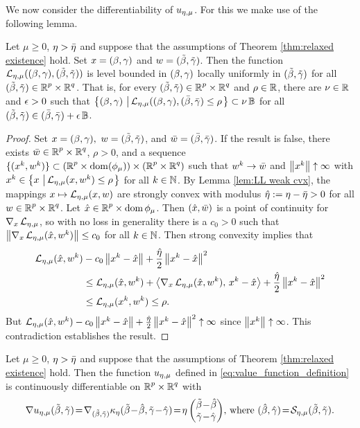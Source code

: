 We now consider the differentiability of $\uemu$. For this we make use of the
following lemma.

\begin{lemma}
\label{lem:level bdd}
Let $\mu\ge 0$, $\eta>\blam$ and suppose that the assumptions of Theorem \ref{thm:relaxed existence} hold.
Set $x=\bg$ and $w=\tbg$.
Then
the function
$\LL_\emu(\bg,\tbg)$ is level bounded in $\bg$ locally uniformly in $\tbg$
for all $\tbg\in \Rp\times\Rq$. That is, for every 
$\tbg\in\Rp\times\Rq$ and $\rho\in\R$,  
there are $\nu\in\R$ and $\eps>0$ such that
\(
\lset{\bg}{\LL_\emu(\bg,(\bbeta,\bgam)\le\rho}\subset \nu\B
\)
for all $\tbg\in(\bbeta,\bgam)+\eps\B$.
\end{lemma}
\begin{proof}
Set $x=\bg,\ w=\tbg$, and $\bw=(\bbeta,\bgam)$.
If the result is false, there exists $\bw\in\Rp\times\Rq$, $\rho>0$, and a sequence
$\{(x^k,w^k)\}\subset(\Rp\times\dom(\phimu))\times(\Rp\times\Rq)$ 
such that
$w^k\rightarrow\bw$ and $\norm{x^k}\uparrow\infty$ with 
$x^k\in\lset{x}{\LL_\emu(x,w^k)\le\rho}$
for all $k\in\N$. 
By Lemma \ref{lem:LL weak cvx}, the mappings 
$x\mapsto\LL_\emu(x,w)$ are strongly convex with modulus 
$\hat\eta:=\eta-\blam >0$
for all $w\in\Rp\times\Rq$. Let $\hx\in\Rp\times\dom{\phi_\mu}$. 
Then $(\hx,\bw)$
is a point of continuity for $\nabla_x\LL_\emu$, so with no loss in 
generality there is a $c_0>0$ such that 
$\norm{\nabla_x\LL_\emu(\hx,w^k)}\le c_0$ for all $k\in\N$.
Then strong convexity implies that
\[\begin{aligned}
\LL_\emu(\hx,w^k)&-c_0\norm{x^k-\hx}+\frac{\hat\eta}{2}\norm{x^k-\hx}^2
\\ &\le
\LL_\emu(\hx,w^k)+\ip{\nabla_x\LL_\emu(\hx,w^k)}{x^k-\hx}
+\frac{\hat\eta}{2}\norm{x^k-\hx}^2
\\ &\le
\LL_\emu(x^k,w^k)\le\rho.
\end{aligned}\]
But $\LL_\emu(\hx,w^k)-c_0\norm{x^k-\hx}+\frac{\hat\eta}{2}\norm{x^k-\hx}^2\uparrow\infty$ since $\norm{x^k}\uparrow\infty$. This contradiction 
establishes the result.
\end{proof}

\begin{theorem}\label{thm:u diff}
Let $\mu\ge 0$, $\eta>\blam$ and suppose that the assumptions of Theorem \ref{thm:relaxed existence} hold.
Then
the function $\uemu$ defined in \eqref{eq:value_function_definition}
is continuously differentiable on $\Rp\times\Rq$ with 
\begin{equation}\label{eq:grad u}
\nabla \uemu\tbg\!=\!\nabla_{\tbg}\kappa_\eta(\tbeta\!-\!\hbeta,\tgam\!-\!\hgam)
\!=\!\eta
\begin{pmatrix}\tbeta\!-\!\hbeta\\ \tgam\!-\!\hgam\end{pmatrix}
\!,\,
\text{where}\ (\hbeta,\hgam)\!=\!\SS_\emu\tbg.
\end{equation}
\end{theorem}

